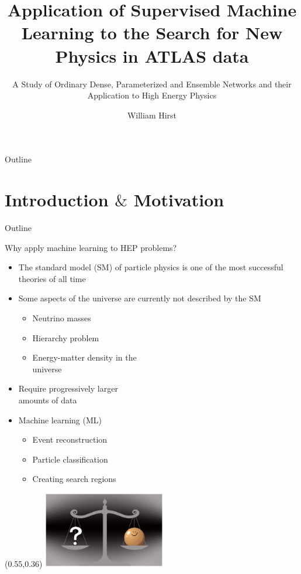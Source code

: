 \documentclass[UKenglish]{beamer}
\author{William Hirst}
\title[Supervised Learning in HEP]{Application of Supervised Machine Learning to the Search for New Physics in ATLAS data}
\subtitle{A Study of Ordinary Dense, Parameterized and Ensemble Networks and their Application to High Energy Physics}
\begin{document}
\begin{frame}{Outline}
    \tableofcontents
\end{frame}


\section{Introduction $\&$ Motivation}
\begin{frame}{Outline}
    \tableofcontents[currentsection]
\end{frame}

\begin{frame}{Why apply machine learning to HEP problems?}
    \begin{itemize}
        \item The standard model (SM) of particle physics is one of the most 
              successful theories of all time
        \item Some aspects of the universe are currently not described by the 
            SM 
        \begin{itemize}
            \item Neutrino masses 
            \item Hierarchy problem 
            \item Energy-matter density in the\\ universe
        \end{itemize}
        \item Require progressively larger\\ amounts of data
        \item Machine learning (ML)
        \begin{itemize}
            \item Event reconstruction
            \item Particle classification
            \item Creating search regions
        \end{itemize}
    \end{itemize}
    \begin{textblock}{1}(0.55,0.36)
        \includegraphics[width=0.4\textwidth]{figures/neutrino}
    \end{textblock}
\end{frame}
\end{document}
